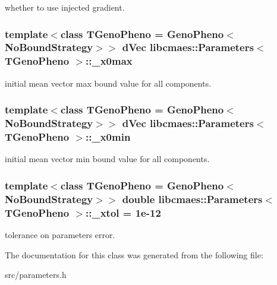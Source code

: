 whether to use injected gradient. \hypertarget{classlibcmaes_1_1Parameters_aece9694af9bee78bb13b0994db7ac45e}{
\subsubsection[{\-\_\-x0max}]{\setlength{\rightskip}{0pt plus 5cm}template$<$class T\-Geno\-Pheno = Geno\-Pheno$<$\-No\-Bound\-Strategy$>$$>$ d\-Vec {\bf libcmaes\-::\-Parameters}$<$ T\-Geno\-Pheno $>$\-::\-\_\-x0max}}\label{classlibcmaes_1_1Parameters_aece9694af9bee78bb13b0994db7ac45e}
initial mean vector max bound value for all components. \hypertarget{classlibcmaes_1_1Parameters_aa3bb27467698d9cb7fc7e0a83b48800f}{
\subsubsection[{\-\_\-x0min}]{\setlength{\rightskip}{0pt plus 5cm}template$<$class T\-Geno\-Pheno = Geno\-Pheno$<$\-No\-Bound\-Strategy$>$$>$ d\-Vec {\bf libcmaes\-::\-Parameters}$<$ T\-Geno\-Pheno $>$\-::\-\_\-x0min}}\label{classlibcmaes_1_1Parameters_aa3bb27467698d9cb7fc7e0a83b48800f}
initial mean vector min bound value for all components. \hypertarget{classlibcmaes_1_1Parameters_aaa9e8eedba7d7140d116163b40f653f8}{
\subsubsection[{\-\_\-xtol}]{\setlength{\rightskip}{0pt plus 5cm}template$<$class T\-Geno\-Pheno = Geno\-Pheno$<$\-No\-Bound\-Strategy$>$$>$ double {\bf libcmaes\-::\-Parameters}$<$ T\-Geno\-Pheno $>$\-::\-\_\-xtol = 1e-\/12}}\label{classlibcmaes_1_1Parameters_aaa9e8eedba7d7140d116163b40f653f8}
tolerance on parameters error. 

The documentation for this class was generated from the following file\-:\begin{DoxyCompactItemize}
\item 
src/parameters.\-h\end{DoxyCompactItemize}
